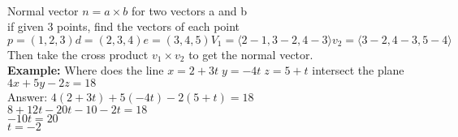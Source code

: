 \documentclass[11pt]{article}
\begin{document}
\begin{enumerate}
\begin{center}
\end{center}
\\
Normal vector $n=a \times b$ for two vectors a and b
\\
if given 3 points, find the vectors of each point $p=(1,2,3) d=(2,3,4) e=(3,4,5) V_1= \langle 2-1, 3-2,4-3 \rangle v_2= \langle 3-2, 4-3, 5-4 \rangle$ Then take the cross product $v_1 \times v_2$ to get the normal vector.
\\
\textbf{Example:} Where does the line $x=2+3t \; y=-4t \; z=5+t$ intersect the plane $4x+5y-2z=18$
\\
Answer: $4(2+3t)+5(-4t)-2(5+t)=18$
\\
$8+12t-20t-10-2t=18$
\\
$-10t=20$
\\
$t=-2$










\end{enumerate}
\end{document}
